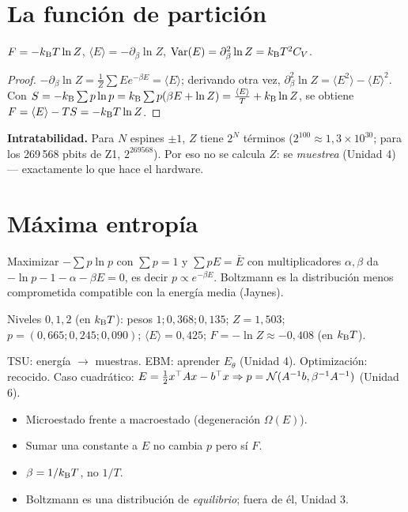\documentclass[11pt,a4paper]{article}
\begin{document}
\section{La función de partición}
\begin{proposicion}
$F=-k_{\mathrm B} T\ln Z$, $\langle E\rangle=-\partial_\beta\ln Z$, $\operatorname{Var}(E)=\partial_\beta^2\ln Z=k_{\mathrm B} T^2C_V$.
\end{proposicion}
\begin{proof}
$-\partial_\beta\ln Z=\frac1Z\sum Ee^{-\beta E}=\langle E\rangle$; derivando otra vez, $\partial_\beta^2\ln Z=\langle E^2\rangle-\langle E\rangle^2$.
Con $S=-k_{\mathrm B}\sum p\ln p=k_{\mathrm B}\sum p(\beta E+\ln Z)=\frac{\langle E\rangle}{T}+k_{\mathrm B}\ln Z$, se obtiene
$F=\langle E\rangle-TS=-k_{\mathrm B} T\ln Z$.
\end{proof}
\textbf{Intratabilidad.} Para $N$ espines $\pm1$, $Z$ tiene $2^N$ términos ($2^{100}\approx1{,}3\times10^{30}$; para los 269\,568
pbits de Z1, $2^{269568}$). Por eso no se calcula $Z$: se \emph{muestrea} (Unidad 4) --- exactamente lo que hace el hardware.

\section{Máxima entropía}
Maximizar $-\sum p\ln p$ con $\sum p=1$ y $\sum pE=\bar E$ con multiplicadores $\alpha,\beta$ da
$-\ln p-1-\alpha-\beta E=0$, es decir $p\propto e^{-\beta E}$. Boltzmann es la distribución menos comprometida
compatible con la energía media (Jaynes).

\begin{ejemplo}
Niveles $0,1,2$ (en $k_{\mathrm B} T$): pesos $1;0{,}368;0{,}135$; $Z=1{,}503$; $p=(0{,}665;0{,}245;0{,}090)$;
$\langle E\rangle=0{,}425$; $F=-\ln Z\approx-0{,}408$ (en $k_{\mathrm B} T$).
\end{ejemplo}

\begin{aplicacion}
TSU: energía $\to$ muestras. EBM: aprender $E_\theta$ (Unidad 4). Optimización: recocido. Caso cuadrático:
$E=\frac12x^\top Ax-b^\top x\Rightarrow p=\mathcal{N}(A^{-1}b,\beta^{-1}A^{-1})$ (Unidad 6).
\end{aplicacion}

\begin{error}
\begin{itemize}[nosep]
\item Microestado frente a macroestado (degeneración $\Omega(E)$).
\item Sumar una constante a $E$ no cambia $p$ pero sí $F$.
\item $\beta=1/k_{\mathrm B} T$, no $1/T$.
\item Boltzmann es una distribución de \emph{equilibrio}; fuera de él, Unidad 3.
\end{itemize}
\end{error}
\end{document}
